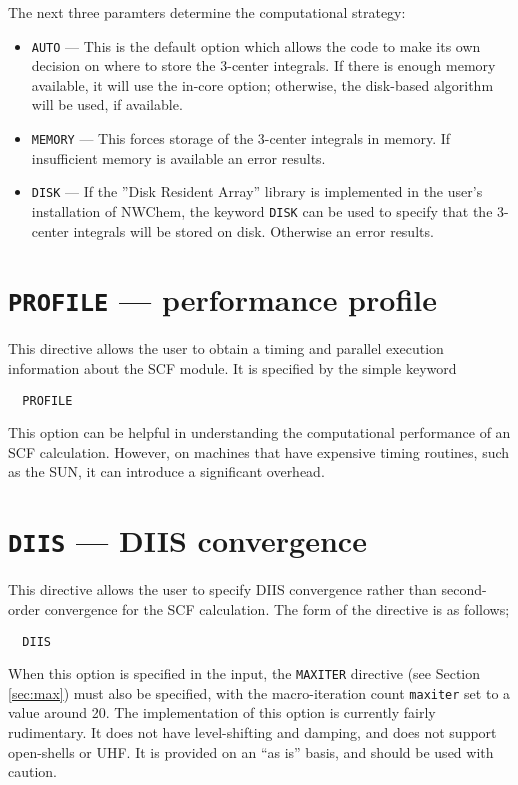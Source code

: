 The next three paramters determine the computational strategy:
\begin{itemize}
\item \verb+AUTO+ --- This is the default option which allows the code
  to make its own decision on where to store the 3-center integrals.
  If there is enough memory available, it will use the in-core option;
  otherwise, the disk-based algorithm will be used, if available.

\item \verb+MEMORY+ --- This forces storage of the 3-center integrals
  in memory.  If insufficient memory is available an error results.

\item \verb+DISK+ --- If the ''Disk Resident Array'' library is
  implemented in the user's installation of NWChem, the keyword
  \verb+DISK+ can be used to specify that the 3-center integrals will
  be stored on disk.  Otherwise an error results.
\end{itemize}

\section{{\tt PROFILE} --- performance profile}

This directive allows the user to obtain a timing and parallel
execution information about the SCF module.  It is specified by the
simple keyword

\begin{verbatim}
  PROFILE
\end{verbatim}

This option can be helpful in understanding the computational
performance of an SCF calculation.  However, on machines that have
expensive timing routines, such as the SUN, it can introduce a
significant overhead.

\section{{\tt DIIS} --- DIIS convergence}

This directive allows the user to specify DIIS convergence rather than
second-order convergence for the SCF calculation.  The form of the
directive is as follows;

\begin{verbatim}
  DIIS
\end{verbatim}

When this option is specified in the input, the \verb+MAXITER+
directive (see Section \ref{sec:max}) must also be specified, with the
macro-iteration count \verb+maxiter+ set to a value around 20.  The
implementation of this option is currently fairly rudimentary.  It
does not have level-shifting and damping, and does not support
open-shells or UHF.  It is provided on an ``as is'' basis, and should
be used with caution.

